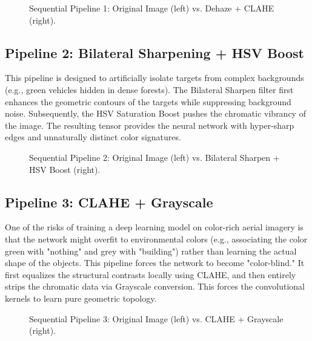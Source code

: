 \begin{figure}[hbt!]
    \centering
    \caption{Sequential Pipeline 1: Original Image (left) vs. Dehaze + CLAHE (right).}
    \label{fig:pipeline_dehaze_clahe}
\end{figure}

\subsection{Pipeline 2: Bilateral Sharpening + HSV Boost}
This pipeline is designed to artificially isolate targets from complex backgrounds (e.g., green vehicles hidden in dense forests). The Bilateral Sharpen filter first enhances the geometric contours of the targets while suppressing background noise. Subsequently, the HSV Saturation Boost pushes the chromatic vibrancy of the image. The resulting tensor provides the neural network with hyper-sharp edges and unnaturally distinct color signatures.

\begin{figure}[hbt!]
    \centering
    \caption{Sequential Pipeline 2: Original Image (left) vs. Bilateral Sharpen + HSV Boost (right).}
    \label{fig:pipeline_sharp_hsv}
\end{figure}

\subsection{Pipeline 3: CLAHE + Grayscale}
One of the risks of training a deep learning model on color-rich aerial imagery is that the network might overfit to environmental colors (e.g., associating the color green with "nothing" and grey with "building") rather than learning the actual shape of the objects. This pipeline forces the network to become "color-blind." It first equalizes the structural contrasts locally using CLAHE, and then entirely strips the chromatic data via Grayscale conversion. This forces the convolutional kernels to learn pure geometric topology.

\begin{figure}[hbt!]
    \centering
    \caption{Sequential Pipeline 3: Original Image (left) vs. CLAHE + Grayscale (right).}
    \label{fig:pipeline_clahe_gray}
\end{figure}

